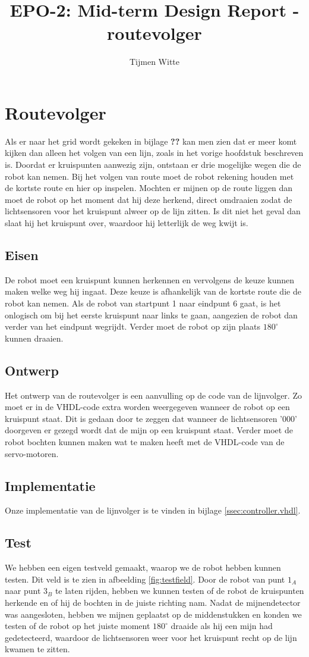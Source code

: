 \documentclass{report}
\title{EPO-2: Mid-term Design Report - routevolger}
\author{Tijmen Witte}
\begin{document}
\chapter{Routevolger}
\label{ch:routevolger}

Als er naar het grid wordt gekeken in bijlage \textbf{??} kan men zien dat er meer komt kijken dan alleen het volgen van een lijn, zoals in het vorige hoofdstuk beschreven is.
Doordat er kruispunten aanwezig zijn, ontstaan er drie mogelijke wegen die de robot kan nemen.
Bij het volgen van route moet de robot rekening houden met de kortste route en hier op inspelen.
Mochten er mijnen op de route liggen dan moet de robot op het moment dat hij deze herkend, direct omdraaien zodat de lichtsensoren voor het kruispunt alweer op de lijn zitten.
Is dit niet het geval dan slaat hij het kruispunt over, waardoor hij letterlijk de weg kwijt is.

\section{Eisen}
De robot moet een kruispunt kunnen herkennen en vervolgens de keuze kunnen maken welke weg hij ingaat.
Deze keuze is afhankelijk van de kortste route die de robot kan nemen.
Als de robot van startpunt 1 naar eindpunt 6 gaat, is het onlogisch om bij het eerste kruispunt naar links te gaan, aangezien de robot dan verder van het eindpunt wegrijdt.
Verder moet de robot op zijn plaats $180^\circ$ kunnen draaien.

\section{Ontwerp}
Het ontwerp van de routevolger is een aanvulling op de code van de lijnvolger.
Zo moet er in de VHDL-code extra worden weergegeven wanneer de robot op een kruispunt staat.
Dit is gedaan door te zeggen dat wanneer de lichtsensoren '000' doorgeven er gezegd wordt dat de mijn op een kruispunt staat.
Verder moet de robot bochten kunnen maken wat te maken heeft met de VHDL-code van de servo-motoren.

\section{Implementatie}
Onze implementatie van de lijnvolger is te vinden in bijlage \ref{ssec:controller.vhdl}.

\section{Test}
We hebben een eigen testveld gemaakt, waarop we de robot hebben kunnen testen.
Dit veld is te zien in afbeelding \ref{fig:testfield}.
Door de robot van punt $1_A$ naar punt $3_B$ te laten rijden, hebben we kunnen testen of de robot de kruispunten herkende en of hij de bochten in de juiste richting nam.
Nadat de mijnendetector was aangesloten, hebben we mijnen geplaatst op de middenstukken en konden we testen of de robot op het juiste moment $180^\circ$ draaide als hij een mijn had gedetecteerd, waardoor de lichtsensoren weer voor het kruispunt  recht op de lijn kwamen te zitten.
\end{document}
